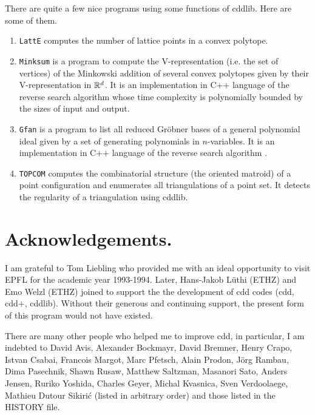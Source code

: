 \documentclass[11pt]{article}
\newcommand {\0} {{\bf 0}}
\newcommand{\R}{{\Bbb R}}
\begin{document}
There are quite a few nice programs using some functions of cddlib.
Here are some of them.


\begin{enumerate}

\item {\tt LattE} \cite{dhhhty-latte-05} computes the number of lattice points
in a convex polytope.

\item {\tt Minksum} \cite{w-msv} is a program to compute the V-representation
(i.e. the set of vertices) of the Minkowski addition of several convex polytopes
given by their V-representation in $\R^d$.  It is an implementation in C++ language
of the reverse search algorithm \cite{f-fzctmacp-04} whose time complexity is
polynomially bounded by the sizes of input and output.

\item {\tt Gfan} \cite{j-gvum} is a program to list all reduced Gr\"obner
bases of a general polynomial ideal given by a set of generating polynomials
in $n$-variables.   It is an implementation in C++ language
of the reverse search algorithm \cite{fjt-cgf-07}.


\item {\tt TOPCOM} \cite{r-topcom-05} computes the combinatorial structure
(the oriented matroid) of a point configuration and enumerates all triangulations
of a point set.   It detects the regularity of a triangulation using cddlib.

\end{enumerate}


\section*{Acknowledgements.}
I am  grateful to Tom  Liebling who
provided me with an ideal opportunity to visit EPFL
for the academic year 1993-1994.  Later, Hans-Jakob L\"uthi (ETHZ) and
Emo Welzl  (ETHZ) joined to support the
the development of cdd codes (cdd, cdd+, cddlib).
Without their generous and continuing support, the present form of
this program would not have existed.

There are many other people who helped me to improve cdd, in particular,
I am indebted to  David Avis,
Alexander Bockmayr, David Bremner, Henry Crapo, Istvan Csabai,
Francois Margot, Marc Pfetsch, Alain Prodon, J\"org Rambau, Dima Pasechnik,
Shawn Rusaw, Matthew Saltzman, Masanori Sato, Anders Jensen,
Ruriko Yoshida, Charles Geyer, Michal Kvasnica, Sven Verdoolaege, 
Mathieu Dutour Sikiri\'c (listed in arbitrary order) and those listed
in the HISTORY file.



%

\end{document}
